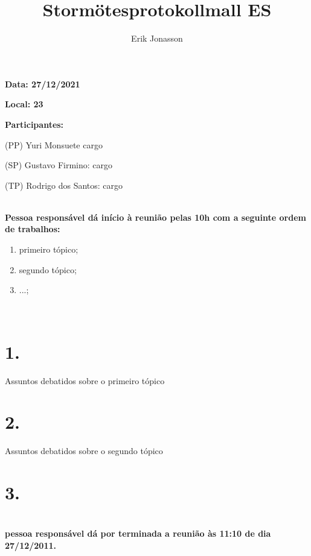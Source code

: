 \documentclass[a4paper, 11pt]{article}
\title{Stormötesprotokollmall ES}
\author{Erik Jonasson}
\begin{document}
\pagestyle{style1}

\textbf{Data: 27/12/2021} %

\textbf{Local: 23} %

\textbf{Participantes:} 
\begin{description}
\item (PP) Yuri Monsuete cargo
\item (SP) Gustavo Firmino: cargo 
\item (TP) Rodrigo dos Santos: cargo
\end{description}

\makebox[\linewidth]{\rule{\linewidth}{0.4pt}}\\
\textbf{Pessoa responsável dá início à reunião pelas 10h com a seguinte ordem de trabalhos:} 
\begin{enumerate}
\item primeiro tópico;
\item segundo tópico;
\item ...;

\end{enumerate}
\makebox[\linewidth]{\rule{\linewidth}{0.4pt}}\\

\section*{1.}
Assuntos debatidos sobre o primeiro tópico
\section*{2. }
Assuntos debatidos sobre o segundo tópico

\section*{3.}
 
 \section*{}
\textbf{pessoa responsável dá por terminada a reunião às 11:10 de dia 27/12/2011.}
\end{document}
